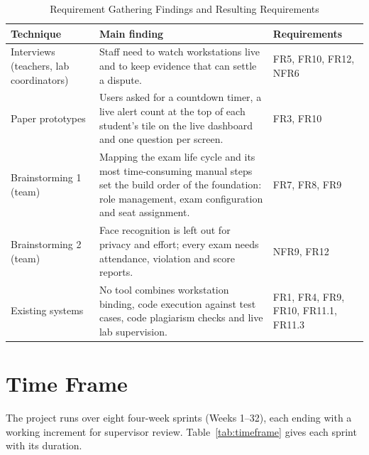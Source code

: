 \begin{table}[H]
\centering
\caption{Requirement Gathering Findings and Resulting Requirements}
\label{tab:gathering}
\renewcommand{\arraystretch}{1.2}
\small
\begin{tabular}{>{\raggedright\arraybackslash}p{2.9cm}>{\raggedright\arraybackslash}p{7.9cm}>{\raggedright\arraybackslash}p{3.4cm}}
\hline\hline
\textbf{Technique} & \textbf{Main finding} & \textbf{Requirements} \\
\hline
Interviews (teachers, lab coordinators) & Staff need to watch workstations live and to keep evidence that can settle a dispute. & FR5, FR10, FR12, NFR6 \\
Paper prototypes & Users asked for a countdown timer, a live alert count at the top of each student's tile on the live dashboard and one question per screen. & FR3, FR10 \\
Brainstorming 1 (team) & Mapping the exam life cycle and its most time-consuming manual steps set the build order of the foundation: role management, exam configuration and seat assignment. & FR7, FR8, FR9 \\
Brainstorming 2 (team) & Face recognition is left out for privacy and effort; every exam needs attendance, violation and score reports. & NFR9, FR12 \\
Existing systems & No tool combines workstation binding, code execution against test cases, code plagiarism checks and live lab supervision. & FR1, FR4, FR9, FR10, FR11.1, FR11.3 \\
\hline\hline
\end{tabular}
\end{table}

\section{Time Frame}
The project runs over eight four-week sprints (Weeks 1--32), each ending with a working increment for supervisor review. Table~\ref{tab:timeframe} gives each sprint with its duration.

